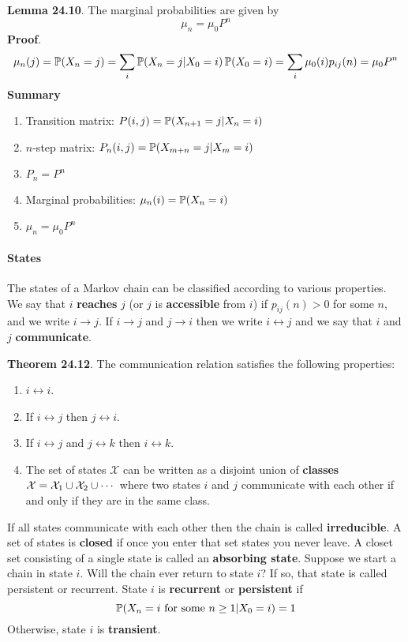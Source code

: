 \textbf{Lemma 24.10}. The marginal probabilities are given by
\[
\mu_{n} = \mu_{0} P^{n}
\]
\textbf{Proof}.
\[
\mu_{n}(j) = \operatorname{\mathbb{P}}(X_{n} = j) = \sum_{i} \operatorname{\mathbb{P}}(X_{n} = j | X_{0} = i) \operatorname{\mathbb{P}}(X_{0} = i) = \sum_{i} \mu_{0}(i) p_{ij}(n) = \mu_{0} P^{n}
\]
\textbf{Summary}
\begin{enumerate}[tightlist,label={\arabic*.}]
\item
  Transition matrix: \(P(i, j) = \operatorname{\mathbb{P}}(X_{n+1} = j | X_{n} = i)\)
\item
  \(n\)-step matrix: \(P_{n}(i, j) = \operatorname{\mathbb{P}}(X_{m+n} = j | X_m = i)\)
\item
  \(P_{n} = P^{n}\)
\item
  Marginal probabilities: \(\mu_{n}(i) = \operatorname{\mathbb{P}}(X_{n} = i)\)
\item
  \(\mu_{n} = \mu_{0} P^{n}\)
\end{enumerate}
\paragraph{States}\label{states}
The states of a Markov chain can be classified according to various
properties.
We say that \(i\) \textbf{reaches} \(j\) (or \(j\) is
\textbf{accessible} from \(i\)) if \(p_{ij}(n) > 0\) for some \(n\), and
we write \(i \rightarrow j\). If \(i \rightarrow j\) and
\(j \rightarrow i\) then we write \(i \leftrightarrow j\) and we say
that \(i\) and \(j\) \textbf{communicate}.

\textbf{Theorem 24.12}. The communication relation satisfies the
following properties:
\begin{enumerate}[tightlist,label={\arabic*.}]
\item
  \(i \leftrightarrow i\).
\item
  If \(i \leftrightarrow j\) then \(j \leftrightarrow i\).
\item
  If \(i \leftrightarrow j\) and \(j \leftrightarrow k\) then
  \(i \leftrightarrow k\).
\item
  The set of states \(\mathcal{X}\) can be written as a disjoint union
  of \textbf{classes}
  \(\mathcal{X} = \mathcal{X}_{1} \cup \mathcal{X}_{2} \cup \cdots\) where
  two states \(i\) and \(j\) communicate with each other if and only if
  they are in the same class.
\end{enumerate}
If all states communicate with each other then the chain is called
\textbf{irreducible}. A set of states is \textbf{closed} if once you
enter that set states you never leave. A closet set consisting of a
single state is called an \textbf{absorbing state}.
Suppose we start a chain in state \(i\). Will the chain ever return to
state \(i\)? If so, that state is called persistent or recurrent.
State \(i\) is \textbf{recurrent} or \textbf{persistent} if
\[
\operatorname{\mathbb{P}}(X_{n} = i \text{ for some } n \geq 1 | X_{0} = i) = 1
\]
Otherwise, state \(i\) is \textbf{transient}.

